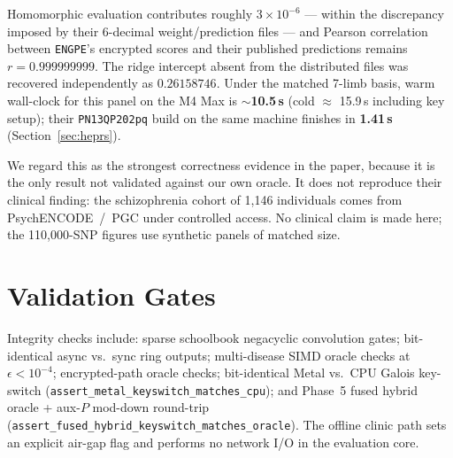 \documentclass[11pt,a4paper]{article}
\newcommand{\engpe}{\texttt{ENGPE}}
\DeclareRobustCommand{\code}[1]{\texttt{#1}}
\newcommand{\longcode}[1]{{\urlstyle{tt}\nolinkurl{#1}}}
\begin{document}
Homomorphic evaluation contributes roughly $3\times10^{-6}$ --- within the
discrepancy imposed by their 6-decimal weight/prediction files --- and Pearson
correlation between \engpe{}'s encrypted scores and their published predictions
remains $r = 0.999999999$. The ridge intercept absent from the distributed files
was recovered independently as $0.26158746$. Under the matched 7-limb basis, warm
wall-clock for this panel on the M4 Max is \textbf{$\sim$10.5\,s}
(cold $\approx$ 15.9\,s including key setup); their \code{PN13QP202pq} build on
the same machine finishes in \textbf{1.41\,s} (Section~\ref{sec:heprs}).

We regard this as the strongest correctness evidence in the paper, because it is
the only result not validated against our own oracle. It does not reproduce their
clinical finding: the schizophrenia cohort of 1{,}146 individuals comes from
PsychENCODE~/~PGC under controlled access. No clinical claim is made here; the
110{,}000-SNP figures use synthetic panels of matched size.

\section{Validation Gates}
\label{sec:gates}

Integrity checks include: sparse schoolbook negacyclic convolution gates;
bit-identical async vs.\ sync ring outputs; multi-disease SIMD oracle checks at
$\epsilon < 10^{-4}$; encrypted-path oracle checks; bit-identical Metal vs.\ CPU
Galois key-switch (\longcode{assert_metal_keyswitch_matches_cpu}); and Phase~5
fused hybrid oracle + aux-$P$ mod-down round-trip
(\longcode{assert_fused_hybrid_keyswitch_matches_oracle}). The offline clinic
path sets an explicit air-gap flag and performs no network I/O in the evaluation
core.
\end{document}
